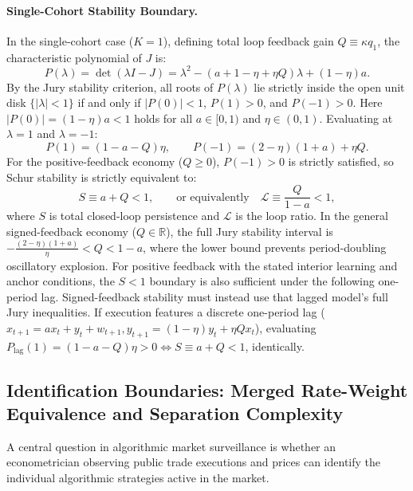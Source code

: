 \documentclass[12pt]{article}
\theoremstyle{definition}
\theoremstyle{remark}
\newcommand{\R}{\mathbb{R}}
\begin{document}
\paragraph{Single-Cohort Stability Boundary.}
In the single-cohort case ($K=1$), defining total loop feedback gain $Q \equiv \kappa q_1$, the characteristic polynomial of $J$ is:
\begin{equation}
P(\lambda) = \det(\lambda I - J) = \lambda^2 - \left( a + 1 - \eta + \eta Q \right) \lambda + (1 - \eta) a.
\label{eq:char_poly}
\end{equation}
By the Jury stability criterion, all roots of $P(\lambda)$ lie strictly inside the open unit disk $\{|\lambda| < 1\}$ if and only if $|P(0)| < 1$, $P(1) > 0$, and $P(-1) > 0$. Here $|P(0)| = (1 - \eta)a < 1$ holds for all $a \in [0, 1)$ and $\eta \in (0, 1)$. Evaluating at $\lambda = 1$ and $\lambda = -1$:
\begin{equation}
P(1) = (1 - a - Q) \eta, \qquad P(-1) = (2 - \eta)(1 + a) + \eta Q.
\end{equation}
For the positive-feedback economy ($Q \ge 0$), $P(-1) > 0$ is strictly satisfied, so Schur stability is strictly equivalent to:
\begin{equation}
S \equiv a + Q < 1, \qquad \text{or equivalently} \quad \mathcal{L} \equiv \frac{Q}{1 - a} < 1,
\label{eq:stability_cond}
\end{equation}
where $S$ is total closed-loop persistence and $\mathcal{L}$ is the loop ratio. In the general signed-feedback economy ($Q \in \R$), the full Jury stability interval is $-\frac{(2-\eta)(1+a)}{\eta} < Q < 1 - a$, where the lower bound prevents period-doubling oscillatory explosion. For positive feedback with the stated interior learning and anchor conditions, the $S<1$ boundary is also sufficient under the following one-period lag. Signed-feedback stability must instead use that lagged model's full Jury inequalities. If execution features a discrete one-period lag ($x_{t+1} = a x_t + y_t + w_{t+1}, y_{t+1} = (1 - \eta) y_t + \eta Q x_t$), evaluating $P_{\text{lag}}(1) = (1 - a - Q)\eta > 0 \iff S \equiv a + Q < 1$, identically.

\subsection{Identification Boundaries: Merged Rate-Weight Equivalence and Separation Complexity}
A central question in algorithmic market surveillance is whether an econometrician observing public trade executions and prices can identify the individual algorithmic strategies active in the market.
\end{document}
